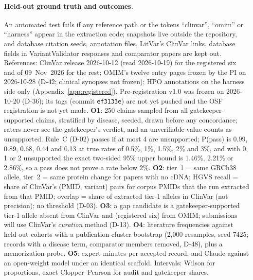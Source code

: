 \documentclass{article} %
\begin{document}
\paragraph{Held-out ground truth and outcomes.} An automated test fails if any reference path or the tokens ``clinvar'', ``omim'' or ``harness'' appear in the extraction code; snapshots live outside the repository, and database citation seeds, annotation files, LitVar's ClinVar links, database fields in VariantValidator responses and comparator papers are kept out. References: ClinVar release 2026-10-12 (read 2026-10-19) for the registered six and of 09~Nov~2026 for the rest; OMIM's twelve entry pages frozen by the PI on 2026-10-28 (D-42; clinical synopses not frozen); HPO annotations on the harness side only (Appendix~\ref{app:registered}). Pre-registration v1.0 was frozen on 2026-10-20 (D-36); its tags (commit \texttt{ef3133e}) are not yet pushed and the OSF registration is not yet made. \textbf{O1}: 250 claims sampled from all gatekeeper-supported claims, stratified by disease, seeded, drawn before any concordance; raters never see the gatekeeper's verdict, and an unverifiable value counts as unsupported. Rule~C (D-02) passes if at most 4 are unsupported; P(pass) is 0.99, 0.89, 0.68, 0.44 and 0.13 at true rates of 0.5\%, 1\%, 1.5\%, 2\% and 3\%, and with 0, 1 or 2 unsupported the exact two-sided 95\% upper bound is 1.46\%, 2.21\% or 2.86\%, so a pass does not prove a rate below 2\%. \textbf{O2}: tier~1 = same GRCh38 allele, tier~2 = same protein change for papers with no cDNA; HGVS recall = share of ClinVar's (PMID, variant) pairs for corpus PMIDs that the run extracted from that PMID; overlap = share of extracted tier-1 alleles in ClinVar (not precision); no threshold (D-03). \textbf{O3}: a gap candidate is a gatekeeper-supported tier-1 allele absent from ClinVar and (registered six) from OMIM; submissions will use ClinVar's \emph{curation} method (D-13). \textbf{O4}: literature frequencies against held-out cohorts with a publication-cluster bootstrap \citep{Efron1979BootstrapMethods} (2,000 resamples, seed 7425; records with a disease term, comparator members removed, D-48), plus a memorization probe. \textbf{O5}: expert minutes per accepted record, and Claude against an open-weight model under an identical scaffold. Intervals: Wilson \citep{Wilson1927ProbableInference} for proportions, exact Clopper--Pearson \citep{Clopper1934UseConfidence} for audit and gatekeeper shares.
\end{document}
